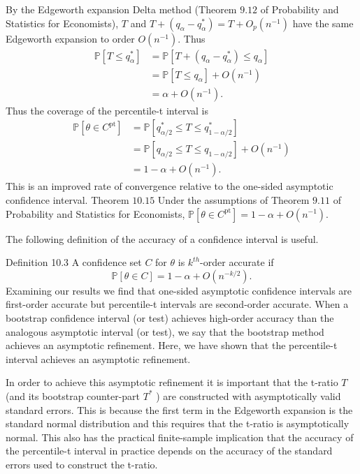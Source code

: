 \documentclass[10pt]{article}
\begin{document}
By the Edgeworth expansion Delta method (Theorem $9.12$ of Probability and Statistics for Economists), $T$ and $T+\left(q_{\alpha}-q_{\alpha}^{*}\right)=T+O_{p}\left(n^{-1}\right)$ have the same Edgeworth expansion to order $O\left(n^{-1}\right)$. Thus
$$
\begin{aligned}
\mathbb{P}\left[T \leq q_{\alpha}^{*}\right] &=\mathbb{P}\left[T+\left(q_{\alpha}-q_{\alpha}^{*}\right) \leq q_{\alpha}\right] \\
&=\mathbb{P}\left[T \leq q_{\alpha}\right]+O\left(n^{-1}\right) \\
&=\alpha+O\left(n^{-1}\right) .
\end{aligned}
$$
Thus the coverage of the percentile-t interval is
$$
\begin{aligned}
\mathbb{P}\left[\theta \in C^{\mathrm{pt}}\right] &=\mathbb{P}\left[q_{\alpha / 2}^{*} \leq T \leq q_{1-\alpha / 2}^{*}\right] \\
&=\mathbb{P}\left[q_{\alpha / 2} \leq T \leq q_{1-\alpha / 2}\right]+O\left(n^{-1}\right) \\
&=1-\alpha+O\left(n^{-1}\right) .
\end{aligned}
$$
This is an improved rate of convergence relative to the one-sided asymptotic confidence interval. Theorem $10.15$ Under the assumptions of Theorem $9.11$ of Probability and Statistics for Economists, $\mathbb{P}\left[\theta \in C^{\mathrm{pt}}\right]=1-\alpha+O\left(n^{-1}\right)$.

The following definition of the accuracy of a confidence interval is useful.

Definition 10.3 A confidence set $C$ for $\theta$ is $k^{t h}$-order accurate if
$$
\mathbb{P}[\theta \in C]=1-\alpha+O\left(n^{-k / 2}\right) .
$$
Examining our results we find that one-sided asymptotic confidence intervals are first-order accurate but percentile-t intervals are second-order accurate. When a bootstrap confidence interval (or test) achieves high-order accuracy than the analogous asymptotic interval (or test), we say that the bootstrap method achieves an asymptotic refinement. Here, we have shown that the percentile-t interval achieves an asymptotic refinement.

In order to achieve this asymptotic refinement it is important that the t-ratio $T$ (and its bootstrap counter-part $T^{*}$ ) are constructed with asymptotically valid standard errors. This is because the first term in the Edgeworth expansion is the standard normal distribution and this requires that the t-ratio is asymptotically normal. This also has the practical finite-sample implication that the accuracy of the percentile-t interval in practice depends on the accuracy of the standard errors used to construct the t-ratio.
\end{document}
